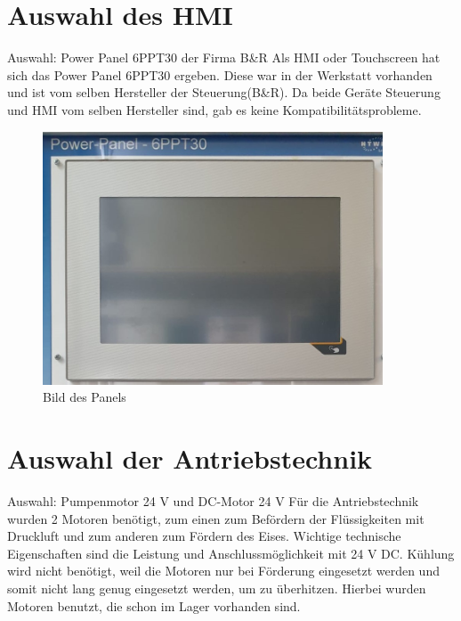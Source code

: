 \documentclass[10pt,a4paper]{report}
\begin{document}
	\section{Auswahl des HMI}
	Auswahl: Power Panel 6PPT30 der Firma B\&R
	Als HMI oder Touchscreen hat sich das Power Panel 6PPT30 ergeben. Diese war in der Werkstatt vorhanden und ist vom selben Hersteller der Steuerung(B\&R). Da beide Geräte Steuerung und HMI vom selben Hersteller sind, gab es keine Kompatibilitätsprobleme.\\
	\begin{figure}[htb]
		\includegraphics[width=0.9\textwidth]{IMG-20230913-WA0001}
		\centering
		\caption{Bild des Panels}
	\end{figure}
	\newpage
	\section{Auswahl der Antriebstechnik}
	Auswahl: Pumpenmotor 24 V   und DC-Motor 24 V 
	Für die Antriebstechnik wurden 2 Motoren benötigt, zum einen zum Befördern der Flüssigkeiten mit Druckluft und zum anderen zum Fördern des Eises. Wichtige technische Eigenschaften sind die Leistung und Anschlussmöglichkeit mit 24 V DC. Kühlung wird nicht benötigt, weil die Motoren nur bei Förderung eingesetzt werden und somit nicht lang genug eingesetzt werden, um zu überhitzen. Hierbei wurden Motoren benutzt, die schon im Lager vorhanden sind. 
\end{document}
